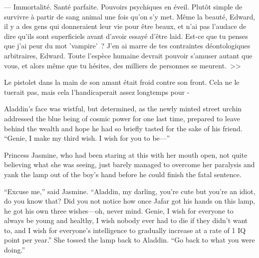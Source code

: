 --- Immortalité. Santé parfaite. Pouvoirs psychiques en éveil. Plutôt simple de survivre à partir de sang animal une fois qu'on s'y met. Même la beauté, Edward, il y a des gens qui donneraient leur vie pour être beaux, et n'ai pas l'audace de dire qu'ils sont superficiels avant d'avoir essayé d'être laid. Est-ce que tu penses que j'ai peur du mot 'vampire'~? J'en ai marre de tes contraintes déontologiques arbitraires, Edward. Toute l'espèce humaine devrait pouvoir s'amuser autant que vous, et alors même que tu hésites, des milliers de personnes se meurent.~>>

Le pistolet dans la main de son amant était froid contre son front. Cela ne le tuerait pas, mais cela l'handicaperait assez longtemps pour -


Aladdin’s face was wistful, but determined, as the newly minted street urchin addressed the blue being of cosmic power for one last time, prepared to leave behind the wealth and hope he had so briefly tasted for the sake of his friend. “Genie, I make my third wish. I wish for you to be—”

Princess Jasmine, who had been staring at this with her mouth open, not quite believing what she was seeing, just barely managed to overcome her paralysis and yank the lamp out of the boy’s hand before he could finish the fatal sentence.

“Excuse me,” said Jasmine. “Aladdin, my darling, you’re cute but you’re an idiot, do you know that? Did you not notice how once Jafar got his hands on this lamp, he got his own three wishes—oh, never mind. Genie, I wish for everyone to always be young and healthy, I wish nobody ever had to die if they didn’t want to, and I wish for everyone’s intelligence to gradually increase at a rate of 1 IQ point per year.” She tossed the lamp back to Aladdin. “Go back to what you were doing.”

%
%

